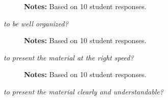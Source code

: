 \begin{boenumerate}
\begin{itemize}
\begin{figure}[h!]\centering
{}\hspace{0.5cm}
\begin{center}
\begin{minipage}[t]{0.85\columnwidth}\vspace{-0.75cm}
\item\scriptsize{\textbf{Notes:} Based on 10 student responses.}
\end{minipage}
\end{center}
\end{figure}
\FloatBarrier
\item \textit{to be well organized?}

\begin{figure}[h!]\centering
{}\hspace{0.5cm}
\begin{center}
\begin{minipage}[t]{0.85\columnwidth}\vspace{-0.75cm}
\item\scriptsize{\textbf{Notes:} Based on 10 student responses.}
\end{minipage}
\end{center}
\end{figure}
\FloatBarrier
\newpage
\item \textit{to present the material at the right speed?}

\begin{figure}[h!]\centering
{}\hspace{0.5cm}
\begin{center}
\begin{minipage}[t]{0.85\columnwidth}\vspace{-0.75cm}
\item\scriptsize{\textbf{Notes:} Based on 10 student responses.}
\end{minipage}
\end{center}
\end{figure}
\FloatBarrier
\item \textit{to present the material clearly and understandable?}


\end{itemize}
\end{boenumerate}
